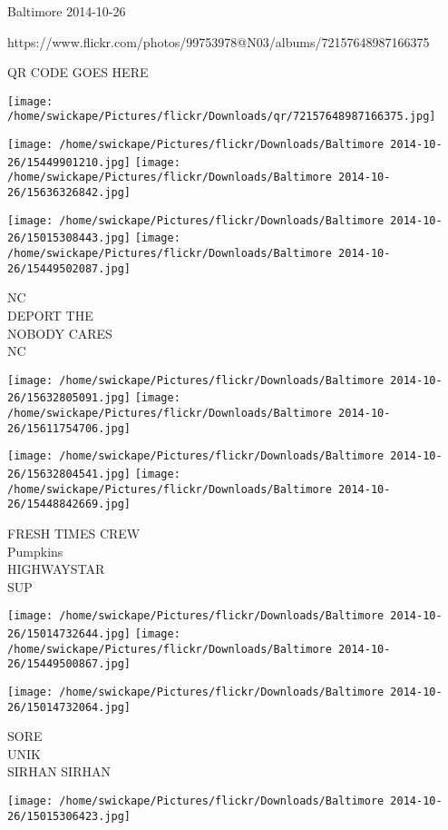 \documentclass[10pt,letterpaper]{article}
\begin{document}
Baltimore 2014-10-26

https://www.flickr.com/photos/99753978@N03/albums/72157648987166375

QR CODE GOES HERE

\texttt{[image: /home/swickape/Pictures/flickr/Downloads/qr/72157648987166375.jpg]}
\pagebreak

\texttt{[image: /home/swickape/Pictures/flickr/Downloads/Baltimore 2014-10-26/15449901210.jpg]}
\texttt{[image: /home/swickape/Pictures/flickr/Downloads/Baltimore 2014-10-26/15636326842.jpg]}

\texttt{[image: /home/swickape/Pictures/flickr/Downloads/Baltimore 2014-10-26/15015308443.jpg]}
\texttt{[image: /home/swickape/Pictures/flickr/Downloads/Baltimore 2014-10-26/15449502087.jpg]}

NC\\
DEPORT THE\\
NOBODY CARES\\
NC\\
\pagebreak

\texttt{[image: /home/swickape/Pictures/flickr/Downloads/Baltimore 2014-10-26/15632805091.jpg]}
\texttt{[image: /home/swickape/Pictures/flickr/Downloads/Baltimore 2014-10-26/15611754706.jpg]}

\texttt{[image: /home/swickape/Pictures/flickr/Downloads/Baltimore 2014-10-26/15632804541.jpg]}
\texttt{[image: /home/swickape/Pictures/flickr/Downloads/Baltimore 2014-10-26/15448842669.jpg]}

FRESH TIMES CREW\\
Pumpkins\\
HIGHWAYSTAR\\
SUP\\
\pagebreak

\texttt{[image: /home/swickape/Pictures/flickr/Downloads/Baltimore 2014-10-26/15014732644.jpg]}
\texttt{[image: /home/swickape/Pictures/flickr/Downloads/Baltimore 2014-10-26/15449500867.jpg]}

\texttt{[image: /home/swickape/Pictures/flickr/Downloads/Baltimore 2014-10-26/15014732064.jpg]}

SORE\\
UNIK\\
SIRHAN SIRHAN\\
\pagebreak

\texttt{[image: /home/swickape/Pictures/flickr/Downloads/Baltimore 2014-10-26/15015306423.jpg]}
\end{document}
